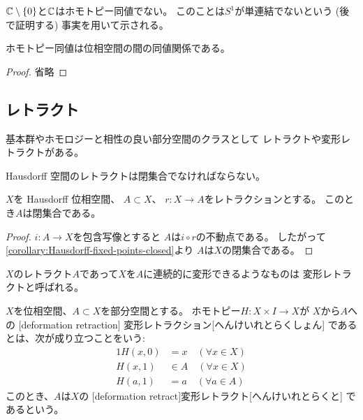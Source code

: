 \documentclass[report]{jlreq}
\begin{document}
\begin{example}[ホモトピー同値でない空間の例]
    $\mathbb{C} \setminus \{0\}$と$\mathbb{C}$はホモトピー同値でない。
    このことは$S^1$が単連結でないという (後で証明する) 事実を用いて示される。
\end{example}

\begin{lemma}[ホモトピー同値は同値関係]
    ホモトピー同値は位相空間の間の同値関係である。
\end{lemma}

\begin{proof}
    省略
\end{proof}

\subsection{レトラクト}

基本群やホモロジーと相性の良い部分空間のクラスとして
レトラクトや変形レトラクトがある。


Hausdorff 空間のレトラクトは閉集合でなければならない。

\begin{proposition}
    $X$を Hausdorff 位相空間、
    $A \subset X$、
    $r \colon X \to A$をレトラクションとする。
    このとき$A$は閉集合である。
\end{proposition}

\begin{proof}
    $i \colon A \to X$を包含写像とすると
    $A$は$i \circ r$の不動点である。
    したがって\cref{corollary:Hausdorff-fixed-points-closed}より
    $A$は$X$の閉集合である。
\end{proof}

$X$のレトラクト$A$であって$X$を$A$に連続的に変形できるようなものは
変形レトラクトと呼ばれる。

\begin{definition}[変形レトラクション]
    $X$を位相空間、$A \subset X$を部分空間とする。
    ホモトピー$H \colon X \times I \to X$が
    $X$から$A$への
    [deformation retraction]
        {変形レトラクション}[へんけいれとらくしょん]
    であるとは、次が成り立つことをいう:
    \begin{alignat}{1}
        H(x, 0) &= x \quad (\forall x \in X) \\
        H(x, 1) &\in A \quad (\forall x \in X) \\
        H(a, 1) &= a \quad (\forall a \in A)
    \end{alignat}
    このとき、$A$は$X$の
    [deformation retract]{変形レトラクト}[へんけいれとらくと]
    であるという。
\end{definition}
\end{document}
